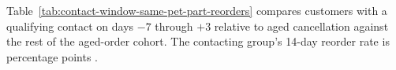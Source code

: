 
Table~\ref{tab:contact-window-same-pet-part-reorders} compares customers with a
qualifying contact on days $-7$ through $+3$ relative to aged cancellation
against the rest of the aged-order cohort. The contacting group's 14-day reorder
rate is \ContactWindowRateDifference{} percentage points
\ContactWindowRateDirection.





\clearpage
\nolinenumbers
